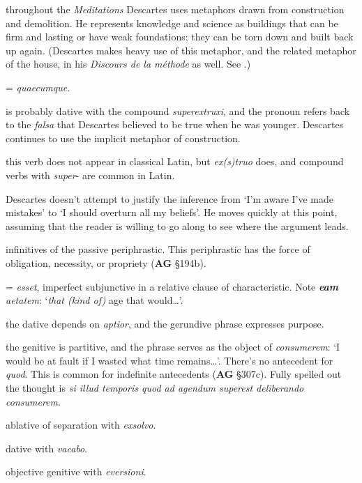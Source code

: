  throughout the \textit{Meditations} Descartes uses metaphors drawn from construction and demolition. He represents knowledge and science as buildings that can be firm and lasting or have weak foundations; they can be torn down and built back up again. (Descartes makes heavy use of this metaphor, and the related metaphor of the house, in his \textit{Discours de la méthode} as well. See \citet[22]{curtis1984}.)

 = \textit{quaecumque}.

 is probably dative with the compound \textit{superextruxi}, and the pronoun refers back to the \textit{falsa} that Descartes believed to be true when he was younger. Descartes continues to use the implicit metaphor of construction.

 this verb does not appear in classical Latin, but \textit{ex(s)truo} does, and compound verbs with \textit{super}- are common in Latin.

 Descartes doesn't attempt to justify the inference from `I'm aware I've made mistakes' to `I should overturn all my beliefs'. He moves quickly at this point, assuming that the reader is willing to go along to see where the argument leads. 

 infinitives of the passive periphrastic. This periphrastic has the force of obligation, necessity, or propriety (\textbf{AG} §194b).

 = \textit{esset}, imperfect subjunctive in a relative clause of characteristic. Note \textit{\textbf{eam} aetatem}: `\textit{that (kind of)} age that would\dots'.

 the dative depends on \textit{aptior}, and the gerundive phrase expresses purpose.

 the genitive is partitive, and the phrase serves as the object of \textit{consumerem}: `I would be at fault if I wasted what time remains\dots'. There's no antecedent for \textit{quod}. This is common for indefinite antecedents (\textbf{AG} §307c). Fully spelled out the thought is \textit{si illud temporis quod ad agendum superest deliberando consumerem}.

 ablative of separation with \textit{exsolvo}.

 dative with \textit{vacabo}.

 objective genitive with \textit{eversioni}.

